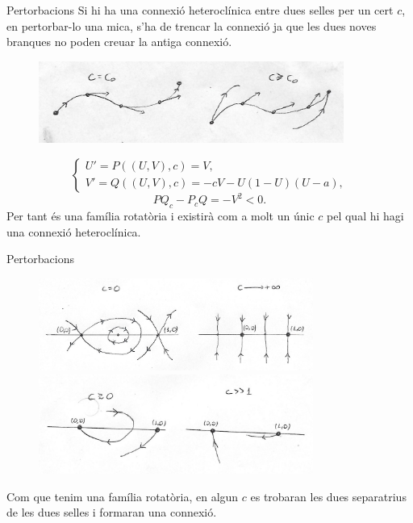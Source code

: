 \documentclass{beamer}
\theoremstyle{definition}
\begin{document}
\begin{frame}{Pertorbacions}
Si hi ha una connexi\'{o} heterocl\'{i}nica entre dues selles per un cert $c$, en pertorbar-lo una mica, s'ha de trencar la connexi\'{o} ja que les dues noves branques no poden creuar la antiga connexi\'{o}.
\begin{figure}[ht!]
\begin{center}
\includegraphics[width=10cm]{Trencament.jpg}
\end{center}
\end{figure}
\pause
\[\left\{\begin{array}{l}U'=P((U,V),c)=V,\\V'=Q((U,V),c)=-cV-U(1-U)(U-a),\end{array}\right.\]
\[PQ_c-P_cQ=-V^2<0.\]
\pause
Per tant \'{e}s una fam\'{i}lia rotat\`{o}ria i existir\`{a} com a molt un \'{u}nic $c$ pel qual hi hagi una connexi\'{o} heterocl\'{i}nica.
\end{frame}

\begin{frame}{Pertorbacions}
\begin{figure}[ht!]
\begin{center}
\includegraphics[width=9cm]{Limit.jpg}
\pause
\includegraphics[width=9cm]{Proper.jpg}
\end{center}
\end{figure}
\pause
Com que tenim una fam\'{i}lia rotat\`{o}ria, en algun $c$ es trobaran les dues separatrius de les dues selles i formaran una connexi\'{o}.
\end{frame}
\end{document}
